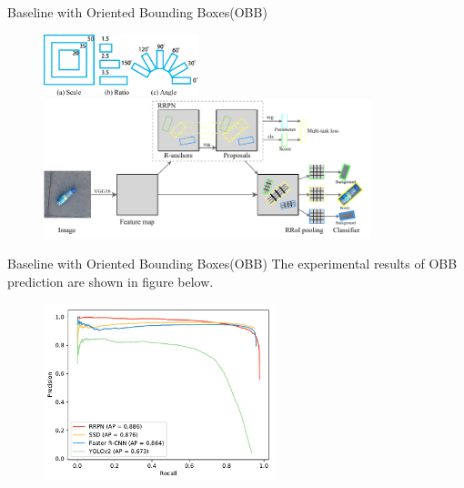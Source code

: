 \documentclass[newPxFont,fullfooter,sectionpages, progressbar]{beamer}
\begin{document}
\begin{frame}{Baseline with Oriented Bounding Boxes(OBB)}

	\begin{figure}
		\centering
		\includegraphics[width=0.4\textwidth]{images/scale_ratio_angle.pdf}
		\par
		\includegraphics[width=0.85\textwidth]{images/RRPN.pdf}
	\end{figure}
\end{frame}

\begin{frame}{Baseline with Oriented Bounding Boxes(OBB)}
	The experimental results of OBB prediction are shown in figure below.
	\begin{figure}
		\centering
		\includegraphics[width=0.6\textwidth]{images/pr_rbbox.pdf}
	\end{figure}
\end{frame}
\end{document}
